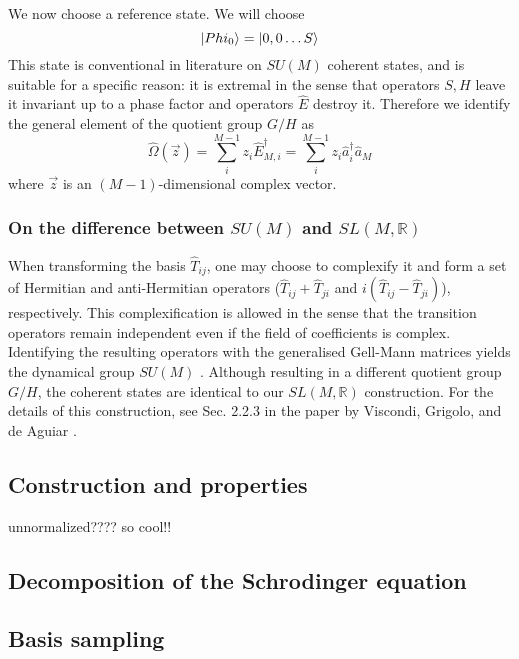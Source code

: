 \documentclass[12pt]{article}
\begin{document}
	We now choose a reference state. We will choose
	\begin{equation}
	\ket{Phi_0}=\ket{0,0\dots S}
	\end{equation}
	This state is conventional in literature on $SU(M)$ coherent states, and is suitable for a specific reason: it is extremal in the sense that operators $S, H$ leave it invariant up to a phase factor and operators $\hat{E}$ destroy it. Therefore we identify the general element of the quotient group $G/H$ as
	\begin{equation}
	\hat{\Omega}(\vec{z})=\sum_i^{M-1}z_i\hat{E}^\dagger_{M,i}=\sum_i^{M-1}z_i\hat{a}^\dagger_i\hat{a}_M
	\end{equation}
	where $\vec{z}$ is an $(M-1)$-dimensional complex vector.
	
	\subsubsection{On the difference between $SU(M)$ and $SL(M,\mathbb{R})$}
	When transforming the basis $\hat{T}_{ij}$, one may choose to complexify it and form a set of Hermitian and anti-Hermitian operators ($\hat{T}_{ij}+\hat{T}_{ji}$ and $i(\hat{T}_{ij}-\hat{T}_{ji})$), respectively. This complexification is allowed in the sense that the transition operators remain independent even if the field of coefficients is complex. Identifying the resulting operators with the generalised Gell-Mann matrices yields the dynamical group $SU(M)$ \cite{gellmann}. Although resulting in a different quotient group $G/H$, the coherent states are identical to our $SL(M,\mathbb{R})$ construction. For the details of this construction, see Sec. 2.2.3 in the paper by Viscondi, Grigolo, and de Aguiar \cite{Aguiar}.
	
	
	\subsection{Construction and properties}
	
	unnormalized???? so cool!!
	
	\subsection{Decomposition of the Schrodinger equation}
	
	\subsection{Basis sampling}
	
\end{document}
